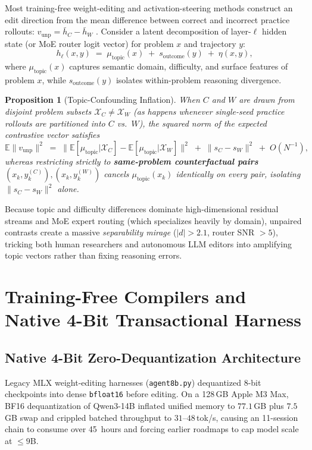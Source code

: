\documentclass[10pt]{article}
\newtheorem{proposition}{Proposition}
\begin{document}
Most training-free weight-editing and activation-steering methods construct an edit direction from the mean difference between correct and incorrect practice rollouts: $v_{\mathrm{unp}} = \bar{h}_C - \bar{h}_W$ \citep{zou2023repe,sun2025thinkedit,fan2026selfrewriting}. Consider a latent decomposition of layer-$\ell$ hidden state (or MoE router logit vector) for problem $x$ and trajectory $y$:
\begin{equation}
h_\ell(x, y) \;=\; \mu_{\mathrm{topic}}(x) \;+\; s_{\mathrm{outcome}}(y) \;+\; \eta(x, y),
\end{equation}
where $\mu_{\mathrm{topic}}(x)$ captures semantic domain, difficulty, and surface features of problem $x$, while $s_{\mathrm{outcome}}(y)$ isolates within-problem reasoning divergence.

\begin{proposition}[Topic-Confounding Inflation]
\label{prop:mirage}
When $C$ and $W$ are drawn from disjoint problem subsets $\mathcal{X}_C \neq \mathcal{X}_W$ (as happens whenever single-seed practice rollouts are partitioned into $C$ vs.\ $W$), the squared norm of the expected contrastive vector satisfies
\begin{equation}
\label{eq:mirage}
\mathbb{E}\|v_{\mathrm{unp}}\|^2 \;=\; \|\mathbb{E}[\mu_{\mathrm{topic}}|\mathcal{X}_C] - \mathbb{E}[\mu_{\mathrm{topic}}|\mathcal{X}_W]\|^2 \;+\; \|s_C - s_W\|^2 \;+\; O(N^{-1}),
\end{equation}
whereas restricting strictly to \textbf{same-problem counterfactual pairs} $(x_k, y_k^{(C)}), (x_k, y_k^{(W)})$ cancels $\mu_{\mathrm{topic}}(x_k)$ identically on every pair, isolating $\|s_C - s_W\|^2$ alone.
\end{proposition}

Because topic and difficulty differences dominate high-dimensional residual streams and MoE expert routing (which specializes heavily by domain), unpaired contrasts create a massive \emph{separability mirage} ($|d| > 2.1$, router SNR $> 5$), tricking both human researchers and autonomous LLM editors into amplifying topic vectors rather than fixing reasoning errors.

\section{Training-Free Compilers and Native 4-Bit Transactional Harness}
\label{sec:methods-sys}

\subsection{Native 4-Bit Zero-Dequantization Architecture}
Legacy MLX weight-editing harnesses (\texttt{agent8b.py}) dequantized 8-bit checkpoints into dense \texttt{bfloat16} before editing. On a 128\,GB Apple M3 Max, BF16 dequantization of Qwen3-14B inflated unified memory to $77.1$\,GB plus $7.5$\,GB swap and crippled batched throughput to $31\text{--}48$\,tok/s, causing an 11-session chain to consume over 45~hours and forcing earlier roadmaps to cap model scale at $\le 9$B.
\end{document}
